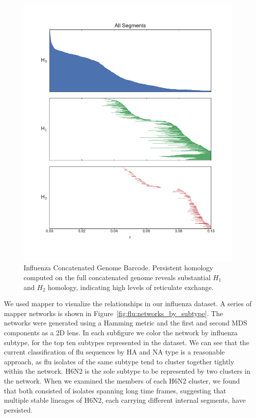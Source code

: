 \begin{figure}
\centering
\includegraphics[]{fig/influenza/flu_concat_barcode.pdf}
\caption[Influenza Concatenated Genome Barcode]{Influenza Concatenated Genome Barcode. Persistent homology computed on the full concatenated genome reveals substantial $H_1$ and $H_2$ homology, indicating high levels of reticulate exchange.}
\label{fig:flu:concatenated_genome_barcode}
\end{figure}

We used mapper to visualize the relationships in our influenza dataset.
A series of mapper networks is shown in Figure~\ref{fig:flu:networks_by_subtype}.
The networks were generated using a Hamming metric and the first and second MDS components as a 2D lens.
In each subfigure we color the network by influenza subtype, for the top ten subtypes represented in the dataset.
We can see that the current classification of flu sequences by HA and NA type is a reasonable approach, as flu isolates of the same subtype tend to cluster together tightly within the network.
H6N2 is the sole subtype to be represented by two clusters in the network.
When we examined the members of each H6N2 cluster, we found that both consisted of isolates spanning long time frames, suggesting that multiple stable lineages of H6N2, each carrying different internal segments, have persisted.

